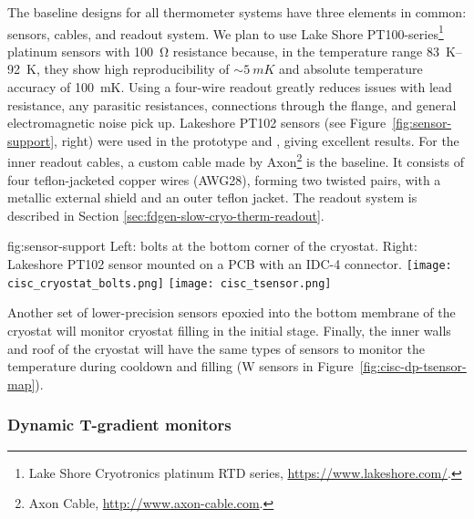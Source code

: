 The baseline designs for all thermometer systems have three elements in
common: sensors, cables, and readout system. We plan to use Lake Shore
PT100-series\footnote{Lake Shore Cryotronics\texttrademark{} platinum RTD series,
  \url{https://www.lakeshore.com/}.} %
platinum sensors with \SI{100}{\ohm} resistance %
because, in
the temperature range \SIrange{83}{92}{K}, %
they 
show high reproducibility of $\sim\SI{5}{mK}$ and absolute temperature
accuracy of \SI{100}{mK}.  Using a four-wire readout greatly reduces
issues with lead resistance, any parasitic resistances,
connections through the flange, and general electromagnetic noise
pick up. Lakeshore PT102 sensors (see
Figure~\ref{fig:sensor-support}, right) were used in the  prototype
and , %
giving excellent results. For the inner
readout cables, a custom cable made by Axon\footnote{Axon\texttrademark{} Cable, \url{http://www.axon-cable.com}.}
is the baseline. It
consists of four teflon-jacketed copper wires (AWG28), forming two
twisted pairs, with a metallic external shield and an outer teflon
jacket.
The readout system is described in Section \ref{sec:fdgen-slow-cryo-therm-readout}.

\begin{dunefigure}{fig:sensor-support}
  {Left: bolts at the bottom corner of the cryostat. Right: Lakeshore PT102 sensor mounted on a PCB with an IDC-4 connector.}
  \texttt{[image: cisc\_cryostat\_bolts.png]}%
    \hspace{1cm}%
  \texttt{[image: cisc\_tsensor.png]}%
\end{dunefigure}


Another set of lower-precision sensors epoxied into the bottom membrane of the cryostat will monitor  cryostat filling in the initial stage.   
Finally, the inner walls and roof of the cryostat will have the same types of sensors to monitor the temperature during cooldown and filling (W sensors in Figure~\ref{fig:cisc-dp-tsensor-map}).
 

\subsubsection{Dynamic T-gradient monitors}
\label{sec:fdgen-slow-cryo-dynamic-therm}

